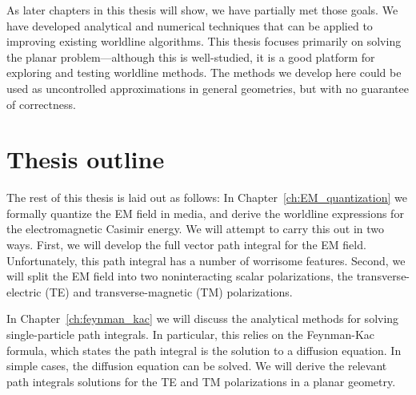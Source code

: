 As later chapters in this thesis will show, we have partially met those goals.  We have developed analytical
and numerical techniques that can be applied to improving existing worldline algorithms.
This thesis focuses primarily on solving the planar problem---although this is well-studied,
it is a good platform for exploring and testing worldline methods.  
The methods we develop here could be used as uncontrolled approximations in general geometries, but with
no guarantee of correctness.  

\section{Thesis outline}

The rest of this thesis is laid out as follows: 
In Chapter~\ref{ch:EM_quantization} we formally quantize
the EM field in media, and derive the worldline expressions for the electromagnetic Casimir energy.
We will attempt to carry this out in two ways. 
First, we will develop the full vector path integral for the EM field.  Unfortunately, this path integral has a number of worrisome features.
Second, we will split the EM field into two noninteracting scalar polarizations,
the transverse-electric (TE) and transverse-magnetic (TM) polarizations.

In Chapter~\ref{ch:feynman_kac} we will discuss the analytical methods for solving single-particle path 
integrals.  In particular, this relies on the Feynman-Kac formula, which states the path integral
 is the solution to a diffusion equation.  In simple cases, the diffusion equation can be solved.
We will derive the relevant path integrals solutions for the TE and TM polarizations in a planar geometry. 

